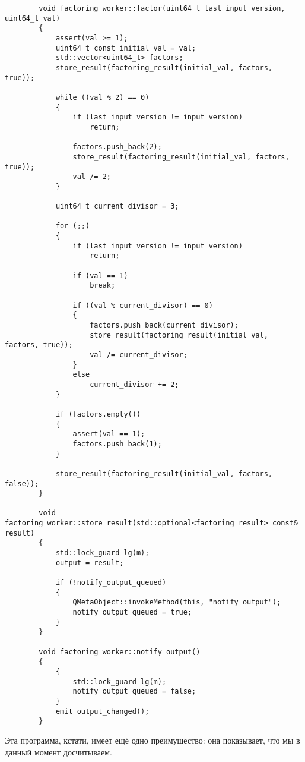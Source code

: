 \documentclass{article}
\begin{document}
\begin{verbatim}
        void factoring_worker::factor(uint64_t last_input_version, uint64_t val)
        {
            assert(val >= 1);
            uint64_t const initial_val = val;
            std::vector<uint64_t> factors;
            store_result(factoring_result(initial_val, factors, true));
            
            while ((val % 2) == 0)
            {
                if (last_input_version != input_version)
                    return;
                
                factors.push_back(2);
                store_result(factoring_result(initial_val, factors, true));
                val /= 2;
            }
            
            uint64_t current_divisor = 3;
            
            for (;;)
            {
                if (last_input_version != input_version)
                    return;
                
                if (val == 1)
                    break;
                
                if ((val % current_divisor) == 0)
                {
                    factors.push_back(current_divisor);
                    store_result(factoring_result(initial_val, factors, true));
                    val /= current_divisor;
                }
                else
                    current_divisor += 2;
            }
            
            if (factors.empty())
            {
                assert(val == 1);
                factors.push_back(1);
            }
            
            store_result(factoring_result(initial_val, factors, false));
        }
        
        void factoring_worker::store_result(std::optional<factoring_result> const& result)
        {
            std::lock_guard lg(m);
            output = result;
            
            if (!notify_output_queued)
            {
                QMetaObject::invokeMethod(this, "notify_output");
                notify_output_queued = true;
            }
        }
        
        void factoring_worker::notify_output()
        {
            {
                std::lock_guard lg(m);
                notify_output_queued = false;
            }
            emit output_changed();
        }
    \end{verbatim}
    Эта программа, кстати, имеет ещё одно преимущество: она показывает, что мы в данный момент досчитываем.\\
\end{document}
